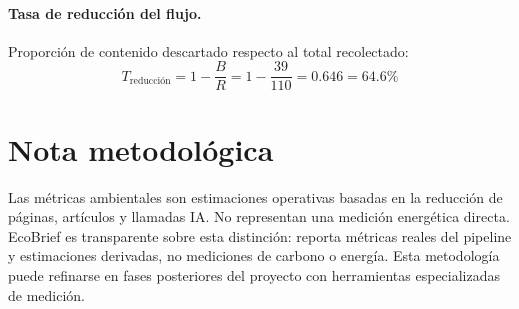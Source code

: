 \paragraph{Tasa de reducci\'on del flujo.} Proporci\'on de contenido descartado respecto al total recolectado:
\begin{equation}
T_{\text{reducci\'on}} = 1 - \frac{B}{R} = 1 - \frac{39}{110} = 0.646 = 64.6\%
\end{equation}

\section{Nota metodol\'ogica}

Las m\'etricas ambientales son estimaciones operativas basadas en la reducci\'on de p\'aginas, art\'iculos y llamadas IA. No representan una medici\'on energ\'etica directa. EcoBrief es transparente sobre esta distinci\'on: reporta m\'etricas reales del pipeline y estimaciones derivadas, no mediciones de carbono o energ\'ia. Esta metodolog\'ia puede refinarse en fases posteriores del proyecto con herramientas especializadas de medici\'on.
